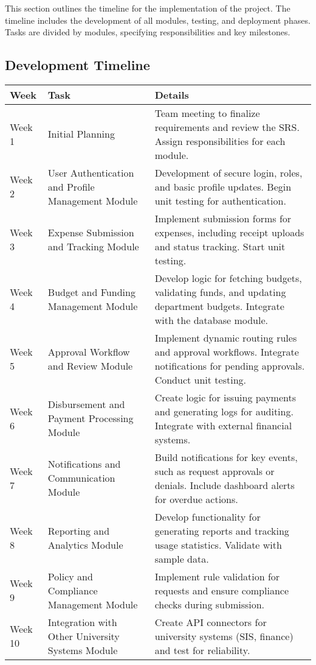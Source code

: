 \documentclass[12pt, titlepage]{article}
\begin{document}
This section outlines the timeline for the implementation of the project. The timeline includes the development of all modules, testing, and deployment phases. Tasks are divided by modules, specifying responsibilities and key milestones.

\subsection{Development Timeline}
\begin{tabularx}{\textwidth}{|l|l|X|}
\hline
\textbf{Week} & \textbf{Task} & \textbf{Details} \\ 
\hline
Week 1 & Initial Planning & Team meeting to finalize requirements and review the SRS. Assign responsibilities for each module. \\ 
\hline
Week 2 & User Authentication and Profile Management Module & Development of secure login, roles, and basic profile updates. Begin unit testing for authentication. \\ 
\hline
Week 3 & Expense Submission and Tracking Module & Implement submission forms for expenses, including receipt uploads and status tracking. Start unit testing. \\ 
\hline
Week 4 & Budget and Funding Management Module & Develop logic for fetching budgets, validating funds, and updating department budgets. Integrate with the database module. \\ 
\hline
Week 5 & Approval Workflow and Review Module & Implement dynamic routing rules and approval workflows. Integrate notifications for pending approvals. Conduct unit testing. \\ 
\hline
Week 6 & Disbursement and Payment Processing Module & Create logic for issuing payments and generating logs for auditing. Integrate with external financial systems. \\ 
\hline
Week 7 & Notifications and Communication Module & Build notifications for key events, such as request approvals or denials. Include dashboard alerts for overdue actions. \\ 
\hline
Week 8 & Reporting and Analytics Module & Develop functionality for generating reports and tracking usage statistics. Validate with sample data. \\ 
\hline
Week 9 & Policy and Compliance Management Module & Implement rule validation for requests and ensure compliance checks during submission. \\ 
\hline
Week 10 & Integration with Other University Systems Module & Create API connectors for university systems (SIS, finance) and test for reliability. \\ 

\end{tabularx}
\end{document}
